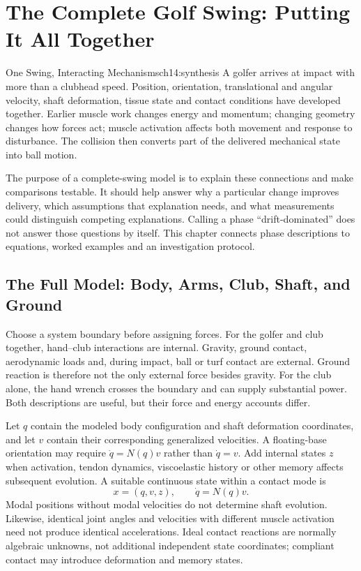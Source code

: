\chapter{The Complete Golf Swing: Putting It All Together}
\label{ch:complete_swing}

\begin{laymansbox}{One Swing, Interacting Mechanisms}{ch14:synthesis}
A golfer arrives at impact with more than a clubhead speed. Position, orientation, translational and angular velocity, shaft deformation, tissue state and contact conditions have developed together. Earlier muscle work changes energy and momentum; changing geometry changes how forces act; muscle activation affects both movement and response to disturbance. The collision then converts part of the delivered mechanical state into ball motion.

The purpose of a complete-swing model is to explain these connections and make comparisons testable. It should help answer why a particular change improves delivery, which assumptions that explanation needs, and what measurements could distinguish competing explanations. Calling a phase ``drift-dominated'' does not answer those questions by itself. This chapter connects phase descriptions to equations, worked examples and an investigation protocol.
\end{laymansbox}

\section{The Full Model: Body, Arms, Club, Shaft, and Ground}

Choose a system boundary before assigning forces. For the golfer and club together, hand--club interactions are internal. Gravity, ground contact, aerodynamic loads and, during impact, ball or turf contact are external. Ground reaction is therefore not the only external force besides gravity. For the club alone, the hand wrench crosses the boundary and can supply substantial power. Both descriptions are useful, but their force and energy accounts differ.

Let $q$ contain the modeled body configuration and shaft deformation coordinates, and let $v$ contain their corresponding generalized velocities. A floating-base orientation may require $\dot q=N(q)v$ rather than $\dot q=v$. Add internal states $z$ when activation, tendon dynamics, viscoelastic history or other memory affects subsequent evolution. A suitable continuous state within a contact mode is
\begin{equation}
x=(q,v,z),\qquad \dot q=N(q)v.
\label{eq:complete_state}
\end{equation}
Modal positions without modal velocities do not determine shaft evolution. Likewise, identical joint angles and velocities with different muscle activation need not produce identical accelerations. Ideal contact reactions are normally algebraic unknowns, not additional independent state coordinates; compliant contact may introduce deformation and memory states.

